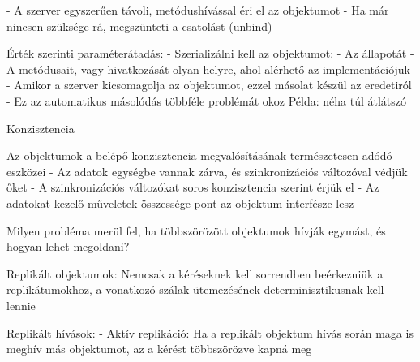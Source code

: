 \documentclass[12pt]{article}
\begin{document}
\begin{description}
                                                                        - A szerver egyszerűen távoli, metódushívással éri el az objektumot
                                                                        - Ha már nincsen szüksége rá, megszünteti a csatolást (unbind)
                                                                    \item Érték szerinti paraméterátadás: 
                                                                        - Szerializálni kell az objektumot:
                                                                        - Az állapotát
                                                                        - A metódusait, vagy hivatkozását olyan helyre, ahol alérhető az implementációjuk
                                                                        - Amikor a szerver kicsomagolja az objektumot, ezzel másolat készül az eredetiról
                                                                        - Ez az automatikus másolódás többféle problémát okoz Példa: néha túl átlátszó
                                                                    \item  Konzisztencia 
                                                                    \item Az objektumok a belépő konzisztencia megvalósításának természetesen adódó eszközei
                                                                        - Az adatok egységbe vannak zárva, és szinkronizációs változóval védjük őket
                                                                        - A szinkronizációs változókat soros konzisztencia szerint érjük el
                                                                        - Az adatokat kezelő műveletek összessége pont az objektum interfésze lesz
                                                                    \item  Milyen probléma merül fel, ha többszörözött objektumok hívják
                                                                        egymást, és hogyan lehet megoldani?  
                                                                    \item Replikált objektumok: Nemcsak a kéréseknek kell sorrendben beérkezniük a replikátumokhoz, a vonatkozó szálak ütemezésének
                                                                        determinisztikusnak kell lennie
                                                                    \item Replikált hívások:
                                                                        - Aktív replikáció: Ha a replikált objektum hívás során maga is meghív más objektumot, az a kérést többszörözve kapná meg

\end{description}
\end{document}
